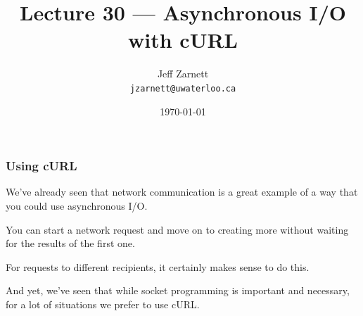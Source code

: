 

\title{Lecture 30 --- Asynchronous I/O with cURL }

\author{Jeff Zarnett \\ \small \texttt{jzarnett@uwaterloo.ca}}
\date{\today}




\begin{frame}
	\titlepage

\end{frame}

\begin{frame}
	\frametitle{Using cURL}

	We've already seen that network communication is a great example of a way that you could use asynchronous I/O.

	You can start a network request and move on to creating more without waiting for the results of the first one.

	For requests to different recipients, it certainly makes sense to do this.

	And yet, we've seen that while socket programming is important and necessary, for a lot of situations we prefer to use cURL.

\end{frame}


